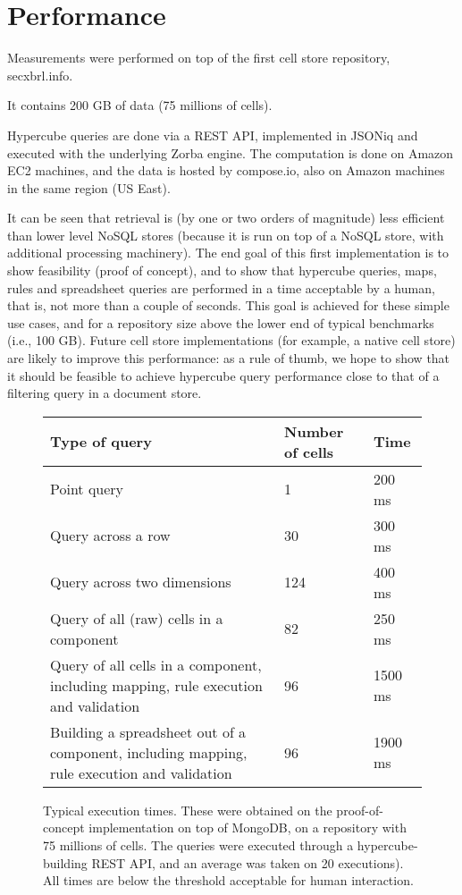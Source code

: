 \documentclass{acm_proc_article-sp}
\begin{document}
\section{Performance}
\label{section-performance}
Measurements were performed on top of the first cell store repository, secxbrl.info.

It contains 200 GB of data (75 millions of cells).

Hypercube queries are done via a REST API, implemented in JSONiq and executed with the underlying Zorba engine. The computation is done on Amazon EC2 machines, and the data is hosted by compose.io, also on Amazon machines in the same region (US East).

It can be seen that retrieval is (by one or two orders of magnitude) less efficient than lower level NoSQL stores (because it is run on top of a NoSQL store, with additional processing machinery). The end goal of this first implementation is to show feasibility (proof of concept), and to show that hypercube queries, maps, rules and spreadsheet queries are performed in a time acceptable by a human, that is, not more than a couple of seconds. This goal is achieved for these simple use cases, and for a repository size above the lower end of typical benchmarks (i.e., 100 GB). Future cell store implementations (for example, a native cell store) are likely to improve this performance: as a rule of thumb, we hope to show that it should be feasible to achieve hypercube query performance close to that of a filtering query in a document store.

\begin{figure*}
\caption{Typical execution times. These were obtained on the proof-of-concept implementation on top of MongoDB, on a repository with 75 millions of cells. The queries were executed through a hypercube-building REST API, and an average was taken on 20 executions). All times are below the threshold acceptable for human interaction.}
\centering
\label{fig-measurements}
\vspace{3mm}
\begin{tabular}{|l|l|l|}
\hline
Type of query & Number of cells & Time \\
\hline
\hline
Point query & 1 & 200 ms \\
\hline
Query across a row&30& 300 ms \\
\hline
Query across two dimensions&124& 400 ms \\
\hline
Query of all (raw) cells in a component &82& 250 ms \\
\hline
Query of all cells in a component, including mapping, rule execution and validation& 96& 1500 ms \\
\hline
Building a spreadsheet out of a component, including mapping, rule execution and validation & 96 & 1900 ms \\
\hline
\end{tabular}
\end{figure*}
\end{document}
